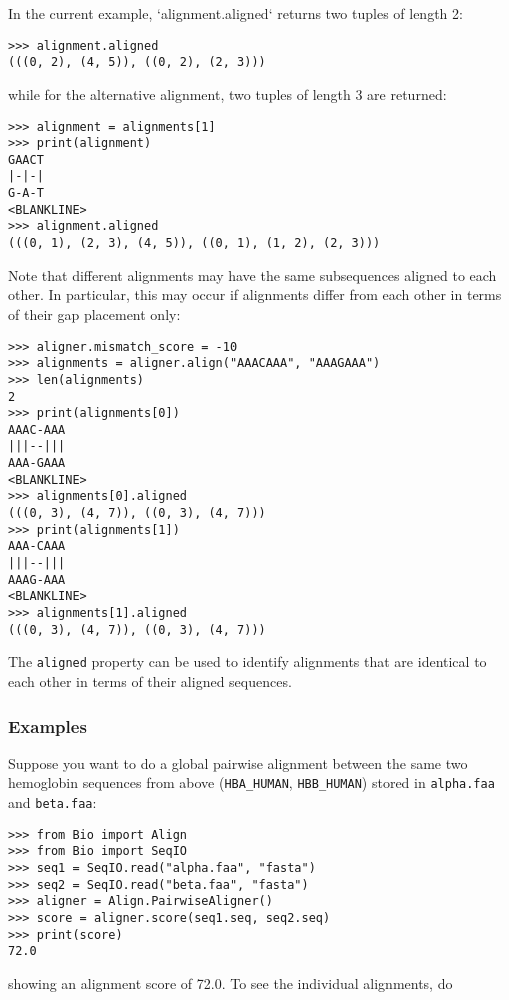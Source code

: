In the current example, `alignment.aligned` returns two tuples of length 2:

\begin{verbatim}
>>> alignment.aligned
(((0, 2), (4, 5)), ((0, 2), (2, 3)))
\end{verbatim}
while for the alternative alignment, two tuples of length 3 are returned:

\begin{verbatim}
>>> alignment = alignments[1]
>>> print(alignment)
GAACT
|-|-|
G-A-T
<BLANKLINE>
>>> alignment.aligned
(((0, 1), (2, 3), (4, 5)), ((0, 1), (1, 2), (2, 3)))
\end{verbatim}
Note that different alignments may have the same subsequences aligned to each other. In particular, this may occur if alignments differ from each other in terms of their gap placement only:

\begin{verbatim}
>>> aligner.mismatch_score = -10
>>> alignments = aligner.align("AAACAAA", "AAAGAAA")
>>> len(alignments)
2
>>> print(alignments[0])
AAAC-AAA
|||--|||
AAA-GAAA
<BLANKLINE>
>>> alignments[0].aligned
(((0, 3), (4, 7)), ((0, 3), (4, 7)))
>>> print(alignments[1])
AAA-CAAA
|||--|||
AAAG-AAA
<BLANKLINE>
>>> alignments[1].aligned
(((0, 3), (4, 7)), ((0, 3), (4, 7)))
\end{verbatim}
The \verb+aligned+ property can be used to identify alignments that are identical to each other in terms of their aligned sequences.

\subsubsection{Examples}
\label{sec:pairwise-examples}

Suppose you want to do a global pairwise alignment between the same two
hemoglobin sequences from above (\texttt{HBA\_HUMAN}, \texttt{HBB\_HUMAN})
stored in \texttt{alpha.faa} and \texttt{beta.faa}:

\begin{verbatim}
>>> from Bio import Align
>>> from Bio import SeqIO
>>> seq1 = SeqIO.read("alpha.faa", "fasta")
>>> seq2 = SeqIO.read("beta.faa", "fasta")
>>> aligner = Align.PairwiseAligner()
>>> score = aligner.score(seq1.seq, seq2.seq)
>>> print(score)
72.0
\end{verbatim}

showing an alignment score of 72.0. To see the individual alignments, do

